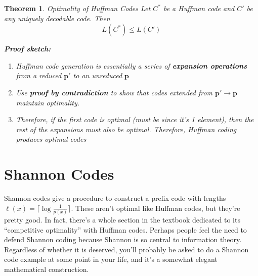 \documentclass[a4paper,12pt]{report}
\newtheorem{theorem}{Theorem}
\begin{document}
\begin{theorem}{Optimality of Huffman Codes}
Let $C^*$ be a Huffman code and $C'$ be any uniquely decodable code. Then 
\begin{equation}
	L(C^*) \leq L(C')
\end{equation}

\textbf{Proof sketch:} 
\begin{enumerate}
\item Huffman code generation is essentially a series of \textbf{expansion
operations} from a reduced $\mathbf p'$ to an unreduced $\mathbf p$
\item Use \textbf{proof by contradiction} to show that codes extended from
$\mathbf p' \to \mathbf p$ maintain optimality. 
\item Therefore, if the first code is optimal (must be since it's 1 element),
then the rest of the expansions must also be optimal. Therefore, Huffman coding
produces optimal codes \qedsymbol{}
\end{enumerate}
\end{theorem}





\section{Shannon Codes}

Shannon codes give a procedure to construct a prefix code with lengths $\ell(x)
= \lceil \log \frac 1 {p(x)} \rceil$. These aren't optimal like Huffman codes,
but they're pretty good. In fact, there's a whole section in the textbook
dedicated to its ``competitive optimality'' with Huffman codes. Perhaps people
feel the need to defend Shannon coding because Shannon is so central to
information theory.  Regardless of whether it is deserved, you'll probably be
asked to do a Shannon code example at some point in your life, and it's a
somewhat elegant mathematical construction. 
\end{document}
